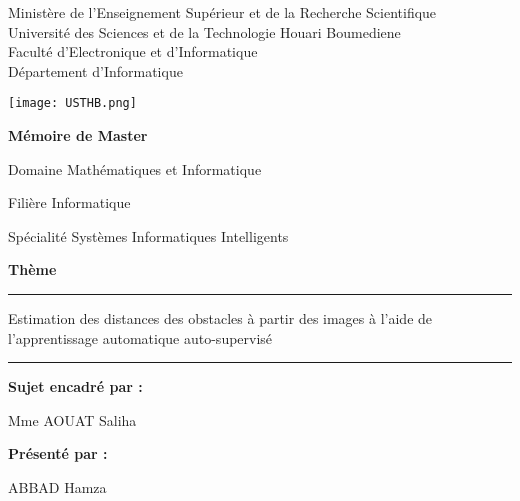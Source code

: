 \begin{titlepage}
\begin{center}
\sffamily
{\small
Ministère de l'Enseignement Supérieur et de la Recherche Scientifique\\
Université des Sciences et de la Technologie Houari Boumediene\\
Faculté d'Electronique et d'Informatique\\
Département d'Informatique\\
}

\vspace{0.75em}

\texttt{[image: USTHB.png]}

\vspace{0.75em}

{\bfseries\LARGE Mémoire de Master}

\vspace{0.75em}

{\large Domaine}
{\large Mathématiques et Informatique}

\vspace{0.75em}

{\large Filière}
{\large Informatique}

\vspace{0.75em}

{\large Spécialité}
{\large Systèmes Informatiques Intelligents}

\vspace{1.5em}

{\bfseries\LARGE Thème}

\rule{\textwidth}{1pt}

{\fontsize{0.8cm}{0.8cm}\selectfont Estimation des distances des obstacles à partir des images à l'aide de l'apprentissage automatique auto-supervisé}

\rule{\textwidth}{1pt}

\vspace{3em}

\begin{minipage}[t]{0.3\textwidth}
\textbf{Sujet encadré par :}

Mme AOUAT Saliha
\end{minipage}
\hspace{\fill}
\begin{minipage}[t]{0.3\textwidth}
\textbf{Présenté par :}

ABBAD Hamza
\end{minipage}

\vspace{\fill}


\end{center}
\end{titlepage}
